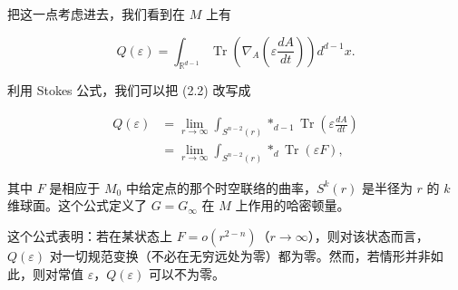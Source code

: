 
把这一点考虑进去，我们看到在 $M$ 上有

\begin{equation}
  \tag{2.2}
  \label{eq:2-2}
  Q(\varepsilon)=\int_{\mathbb{R}^{d-1}}\operatorname{Tr}\left(\nabla_A\left(\varepsilon\frac{dA}{dt}\right)\right)d^{d-1}x.
\end{equation}

利用 Stokes 公式，我们可以把 (2.2) 改写成

\begin{equation}
  \tag{2.3}
  \label{eq:2-3}
  \begin{split}
    Q(\varepsilon)&=\lim_{r\to\infty}\int_{S^{n-2}(r)}*_{d-1}\operatorname{Tr}\left(\varepsilon\frac{dA}{dt}\right)\\
    &=\lim_{r\to\infty}\int_{S^{n-2}(r)}*_d\operatorname{Tr}(\varepsilon F),
  \end{split}
\end{equation}

其中 $F$ 是相应于 $M_0$ 中给定点的那个时空联络的曲率，$S^k(r)$ 是半径为 $r$ 的 $k$ 维球面。这个公式定义了 $G=G_\infty$ 在 $M$ 上作用的哈密顿量。


这个公式表明：若在某状态上 $F=o(r^{2-n})$（$r\to\infty$），则对该状态而言，$Q(\varepsilon)$ 对一切规范变换（不必在无穷远处为零）都为零。然而，若情形并非如此，则对常值 $\varepsilon$，$Q(\varepsilon)$ 可以不为零。

